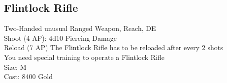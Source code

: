 \subsection{Flintlock Rifle}\label{weapon:flintlockRifle}
Two-Handed unusual Ranged Weapon,  Reach, DE\\
Shoot (4 AP): 4d10 Piercing Damage\\
Reload (7 AP) The Flintlock Rifle has to be reloaded after every 2 shots\\
You need special training to operate a Flintlock Rifle\\
Size: M\\
Cost: 8400 Gold\\
